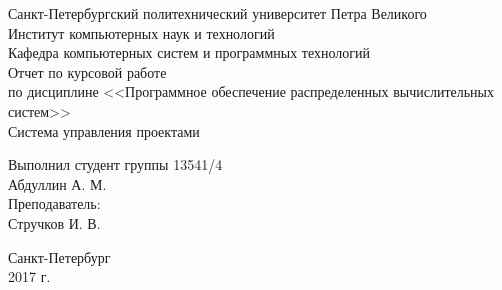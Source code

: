 	\begin{titlepage}
		\begin{center}
			Санкт-Петербургский политехнический	университет Петра Великого\\
			Институт компьютерных наук и технологий\\
			Кафедра компьютерных систем и программных технологий\\
			\vspace{6cm}
			Отчет по курсовой работе\\
			по дисциплине <<Программное обеспечение распределенных вычислительных систем>>\\
			\Large
			Система управления проектами\\
			\small
		\end{center}
		\vspace{3cm}
		\begin{flushright}
			Выполнил студент группы 13541/4\\
			Абдуллин А. М.\\
			\vspace{1cm}			
			Преподаватель:\\
			Стручков И. В.\\
		\end{flushright}
		\vspace{4cm}
		\begin{center}
			Санкт-Петербург\\
			2017 г.\\
		\end{center}
	\end{titlepage}
	\newpage